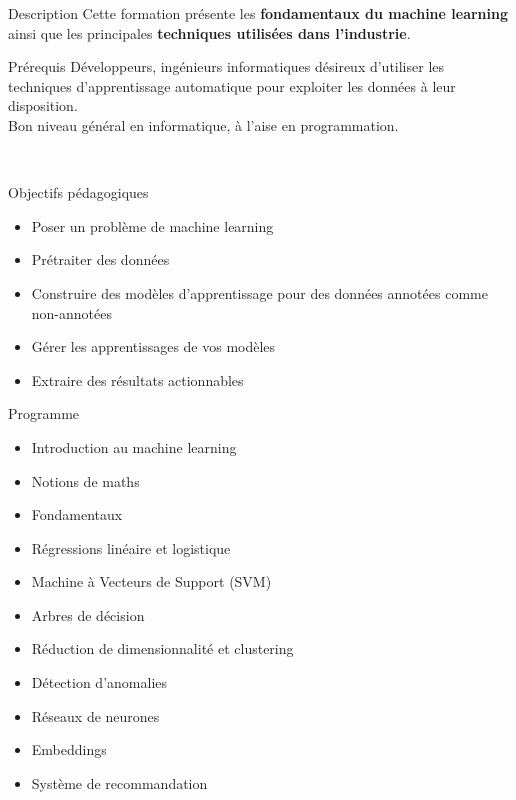 \begin{frame}{Description}
  Cette formation présente les \textbf{fondamentaux du machine learning} ainsi que les principales \textbf{techniques utilisées dans l’industrie}.
\end{frame}

\begin{frame}{Prérequis}
  Développeurs, ingénieurs informatiques désireux d’utiliser les techniques d’apprentissage automatique pour exploiter les données à leur disposition.\\
  \newline
  Bon niveau général en informatique, à l’aise en programmation.\\
  \begin{center}
    \\
    $\;$\\
  \end{center}
\end{frame}

\begin{frame}{Objectifs pédagogiques}
  \begin{itemize}
  \item Poser un problème de machine learning
  \item Prétraiter des données
  \item Construire des modèles d'apprentissage pour des données annotées comme non-annotées
  \item Gérer les apprentissages de vos modèles
  \item Extraire des résultats actionnables
  \end{itemize}
\end{frame}

\begin{frame}{Programme}
  \begin{itemize}
  \item Introduction au machine learning
  \item Notions de maths
  \item Fondamentaux
  \item Régressions linéaire et logistique
  \item Machine à Vecteurs de Support (SVM)
  \item Arbres de décision
  \item Réduction de dimensionnalité et clustering
  \item Détection d'anomalies
  \item Réseaux de neurones
  \item Embeddings
  \item Système de recommandation
  \end{itemize}
\end{frame}
